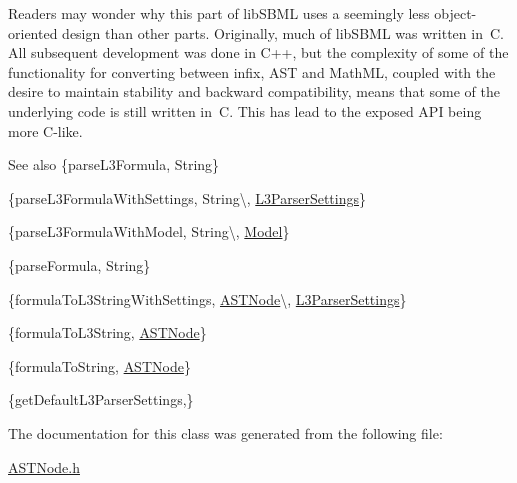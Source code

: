 Readers may wonder why this part of lib\+S\+B\+ML uses a seemingly less object-\/oriented design than other parts. Originally, much of lib\+S\+B\+ML was written in~C. All subsequent development was done in C++, but the complexity of some of the functionality for converting between infix, A\+ST and Math\+ML, coupled with the desire to maintain stability and backward compatibility, means that some of the underlying code is still written in~C. This has lead to the exposed A\+PI being more C-\/like.

\begin{DoxySeeAlso}{See also}
\{parse\+L3\+Formula, String\} 

\{parse\+L3\+Formula\+With\+Settings, String\textbackslash{}, \hyperlink{class_l3_parser_settings}{L3\+Parser\+Settings}\} 

\{parse\+L3\+Formula\+With\+Model, String\textbackslash{}, \hyperlink{class_model}{Model}\} 

\{parse\+Formula, String\} 

\{formula\+To\+L3\+String\+With\+Settings, \hyperlink{class_a_s_t_node}{A\+S\+T\+Node}\textbackslash{}, \hyperlink{class_l3_parser_settings}{L3\+Parser\+Settings}\} 

\{formula\+To\+L3\+String, \hyperlink{class_a_s_t_node}{A\+S\+T\+Node}\} 

\{formula\+To\+String, \hyperlink{class_a_s_t_node}{A\+S\+T\+Node}\} 

\{get\+Default\+L3\+Parser\+Settings,\} 
\end{DoxySeeAlso}


The documentation for this class was generated from the following file\+:\begin{DoxyCompactItemize}
\item 
\hyperlink{_a_s_t_node_8h}{A\+S\+T\+Node.\+h}\end{DoxyCompactItemize}
